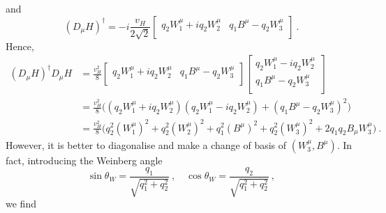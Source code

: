     and 
    \begin{equation*}
        (D_\mu H)^\dagger = - i \frac{v_H}{2\sqrt{2}} \begin{bmatrix}
            q_2 W^\mu_1 + i q_2 W^\mu_2 &
            q_1 B^\mu - q_2 W^\mu_3 \\ 
        \end{bmatrix} ~.
    \end{equation*}
    Hence, 
    \begin{equation*}
    \begin{aligned}
        (D_\mu H)^\dagger D_\mu H & = \frac{v_H^2}{8} \begin{bmatrix}
            q_2 W^\mu_1 + i q_2 W^\mu_2 &
            q_1 B^\mu - q_2 W^\mu_3 \\ 
        \end{bmatrix} \begin{bmatrix}
            q_2 W^\mu_1 - i q_2 W^\mu_2 \\ 
            q_1 B^\mu - q_2 W^\mu_3 \\ 
        \end{bmatrix} \\ & = \frac{v_H^2}{8} \Big ( (q_2 W^\mu_1 + i q_2 W^\mu_2) (q_2 W^\mu_1 - i q_2 W^\mu_2) + (q_1 B^\mu - q_2 W^\mu_3)^2 \Big) \\ & = \frac{v_H^2}{8} \Big ( q_2^2 (W^\mu_1)^2 + q_2^2 (W^\mu_2)^2 + q_1^2 (B^\mu)^2 + q_2^2 (W^\mu_3)^2 + 2 q_1 q_2 B_\mu W^\mu_3 \Big) ~.
    \end{aligned}
    \end{equation*}
    However, it is better to diagonalise and make a change of basis of $(W^\mu_3, B^\mu)$. In fact, introducing the Weinberg angle 
    \begin{equation*}
        \sin \theta_W = \frac{q_1}{\sqrt{q_1^2 + q_2^2}} ~, \quad \cos \theta_W = \frac{q_2}{\sqrt{q_1^2 + q_2^2}} ~,
    \end{equation*}
    we find 

